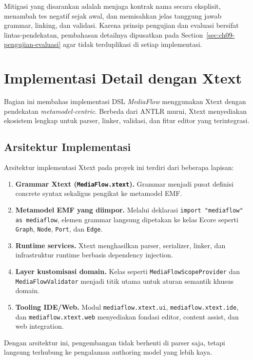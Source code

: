 Mitigasi yang disarankan adalah menjaga kontrak nama secara eksplisit, menambah tes negatif sejak awal, dan memisahkan jelas tanggung jawab grammar, linking, dan validasi.
Karena prinsip pengujian dan evaluasi bersifat lintas-pendekatan, pembahasan detailnya dipusatkan pada Section~\ref{sec:ch09-pengujian-evaluasi} agar tidak terduplikasi di setiap implementasi.

\section{Implementasi Detail dengan Xtext}

Bagian ini membahas implementasi DSL \textit{MediaFlow} menggunakan Xtext dengan pendekatan \textit{metamodel-centric}. Berbeda dari ANTLR murni, Xtext menyediakan ekosistem lengkap untuk parser, linker, validasi, dan fitur editor yang terintegrasi.

\subsection{Arsitektur Implementasi}

Arsitektur implementasi Xtext pada proyek ini terdiri dari beberapa lapisan:
\begin{enumerate}
  \item \textbf{Grammar Xtext (\texttt{MediaFlow.xtext}).} Grammar menjadi pusat definisi concrete syntax sekaligus pengikat ke metamodel EMF.
  \item \textbf{Metamodel EMF yang diimpor.} Melalui deklarasi \texttt{import "mediaflow" as mediaflow}, elemen grammar langsung dipetakan ke kelas Ecore seperti \texttt{Graph}, \texttt{Node}, \texttt{Port}, dan \texttt{Edge}.
  \item \textbf{Runtime services.} Xtext menghasilkan parser, serializer, linker, dan infrastruktur runtime berbasis dependency injection.
  \item \textbf{Layer kustomisasi domain.} Kelas seperti \texttt{MediaFlowScopeProvider} dan \texttt{MediaFlowValidator} menjadi titik utama untuk aturan semantik khusus domain.
  \item \textbf{Tooling IDE/Web.} Modul \texttt{mediaflow.xtext.ui}, \texttt{mediaflow.xtext.ide}, dan \texttt{mediaflow.xtext.web} menyediakan fondasi editor, content assist, dan web integration.
\end{enumerate}

Dengan arsitektur ini, pengembangan tidak berhenti di parser saja, tetapi langsung terhubung ke pengalaman authoring model yang lebih kaya.

